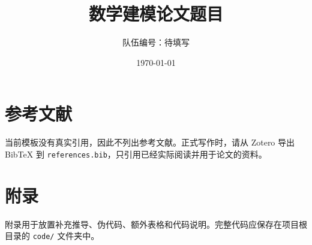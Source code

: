 \documentclass[UTF8,a4paper,12pt]{ctexart}
\title{\textbf{数学建模论文题目}}
\author{队伍编号：待填写}
\date{\today}
\begin{document}
\maketitle



\tableofcontents
\newpage











\section*{参考文献}
当前模板没有真实引用，因此不列出参考文献。正式写作时，请从 Zotero 导出 BibTeX 到 \texttt{references.bib}，只引用已经实际阅读并用于论文的资料。

\appendix
\section{附录}
附录用于放置补充推导、伪代码、额外表格和代码说明。完整代码应保存在项目根目录的 \texttt{code/} 文件夹中。
\end{document}
